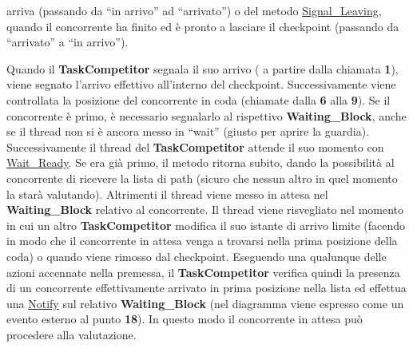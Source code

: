 \begin{description}
\begin{itemize}
arriva (passando da ``in arrivo'' ad ``arrivato'') o del metodo \underline{Signal\_Leaving}, quando il concorrente ha finito ed \`{e} pronto
a lasciare il checkpoint (passando da ``arrivato'' a ``in arrivo'').
\end{itemize}
Quando il \textbf{TaskCompetitor} segnala il suo arrivo ( a partire dalla chiamata \textbf{1}), viene segnato l'arrivo effettivo all'interno del checkpoint. Successivamente
viene controllata la posizione del concorrente in coda (chiamate dalla \textbf{6} alla \textbf{9}). Se il concorrente \`{e} primo, \`{e} necessario segnalarlo al rispettivo 
\textbf{Waiting\_Block}, anche se il thread non si \`{e} ancora messo in ``wait'' (giusto per aprire la guardia). Successivamente il thread del \textbf{TaskCompetitor} attende
il suo momento con \underline{Wait\_Ready}. Se era gi\`{a} primo, il metodo ritorna subito, dando la possibilit\`{a} al concorrente di ricevere la lista di path (sicuro che nessun
altro in quel momento la star\`{a} valutando). Altrimenti il thread viene messo in attesa nel \textbf{Waiting\_Block} relativo al concorrente. Il thread viene risvegliato
nel momento in cui un altro \textbf{TaskCompetitor} modifica il suo istante di arrivo limite (facendo in modo che il concorrente in attesa venga a trovarsi nella prima
posizione della coda) o quando viene rimosso dal checkpoint. Eseguendo una qualunque delle azioni accennate nella premessa, il \textbf{TaskCompetitor} verifica quindi
la presenza di un concorrente effettivamente arrivato in prima posizione nella lista ed effettua una \underline{Notify} sul relativo \textbf{Waiting\_Block} (nel diagramma
viene espresso come un evento esterno al punto \textbf{18}). In questo modo il concorrente in attesa pu\`{o} procedere alla valutazione.
\end{description}
\newpage
